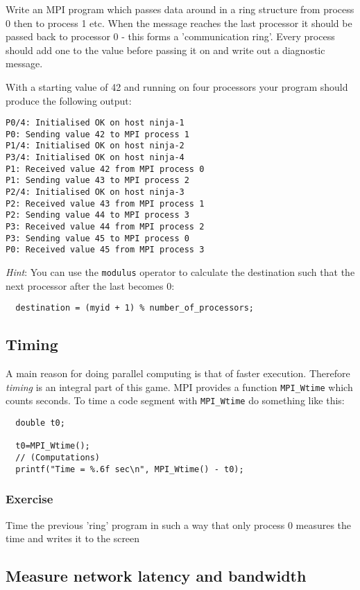 \documentclass[12pt]{article}
\begin{document}
Write an MPI program which passes data
around in a ring structure from process 0 then to process 1 etc.
When the message reaches the last processor it should be passed back to 
processor 0 - this forms a 'communication ring'. 
Every process should add one to the value before passing it on 
and write out a diagnostic message.

With a starting value of 42 and running on four processors your program 
should produce the following output:
\begin{verbatim}
P0/4: Initialised OK on host ninja-1
P0: Sending value 42 to MPI process 1
P1/4: Initialised OK on host ninja-2
P3/4: Initialised OK on host ninja-4
P1: Received value 42 from MPI process 0
P1: Sending value 43 to MPI process 2
P2/4: Initialised OK on host ninja-3
P2: Received value 43 from MPI process 1
P2: Sending value 44 to MPI process 3
P3: Received value 44 from MPI process 2
P3: Sending value 45 to MPI process 0
P0: Received value 45 from MPI process 3
\end{verbatim}
\emph{Hint}: You can use the \texttt{modulus} operator to calculate 
the destination such that the next processor after the last becomes 0:
\begin{verbatim}
  destination = (myid + 1) % number_of_processors;
\end{verbatim}


\subsection*{Timing}
A main reason for doing parallel computing is that of faster execution.
Therefore \emph{timing} is an integral part of this game.
MPI provides a function \texttt{MPI\_Wtime} which counts seconds.
To time a code segment with \texttt{MPI\_Wtime} do something like this:
\begin{verbatim}
  double t0;
  
  t0=MPI_Wtime();
  // (Computations)
  printf("Time = %.6f sec\n", MPI_Wtime() - t0);
\end{verbatim}

\subsubsection*{Exercise}
Time the previous 'ring' program in such a way that only process 0
measures the time and writes it to the screen


\subsection*{Measure network latency and bandwidth}
\end{document}
